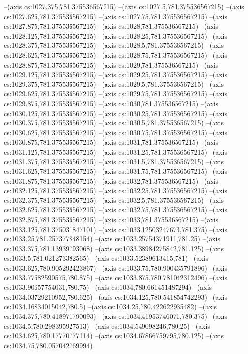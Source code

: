 --(axis cs:1027.375,781.375536567215)
--(axis cs:1027.5,781.375536567215)
--(axis cs:1027.625,781.375536567215)
--(axis cs:1027.75,781.375536567215)
--(axis cs:1027.875,781.375536567215)
--(axis cs:1028,781.375536567215)
--(axis cs:1028.125,781.375536567215)
--(axis cs:1028.25,781.375536567215)
--(axis cs:1028.375,781.375536567215)
--(axis cs:1028.5,781.375536567215)
--(axis cs:1028.625,781.375536567215)
--(axis cs:1028.75,781.375536567215)
--(axis cs:1028.875,781.375536567215)
--(axis cs:1029,781.375536567215)
--(axis cs:1029.125,781.375536567215)
--(axis cs:1029.25,781.375536567215)
--(axis cs:1029.375,781.375536567215)
--(axis cs:1029.5,781.375536567215)
--(axis cs:1029.625,781.375536567215)
--(axis cs:1029.75,781.375536567215)
--(axis cs:1029.875,781.375536567215)
--(axis cs:1030,781.375536567215)
--(axis cs:1030.125,781.375536567215)
--(axis cs:1030.25,781.375536567215)
--(axis cs:1030.375,781.375536567215)
--(axis cs:1030.5,781.375536567215)
--(axis cs:1030.625,781.375536567215)
--(axis cs:1030.75,781.375536567215)
--(axis cs:1030.875,781.375536567215)
--(axis cs:1031,781.375536567215)
--(axis cs:1031.125,781.375536567215)
--(axis cs:1031.25,781.375536567215)
--(axis cs:1031.375,781.375536567215)
--(axis cs:1031.5,781.375536567215)
--(axis cs:1031.625,781.375536567215)
--(axis cs:1031.75,781.375536567215)
--(axis cs:1031.875,781.375536567215)
--(axis cs:1032,781.375536567215)
--(axis cs:1032.125,781.375536567215)
--(axis cs:1032.25,781.375536567215)
--(axis cs:1032.375,781.375536567215)
--(axis cs:1032.5,781.375536567215)
--(axis cs:1032.625,781.375536567215)
--(axis cs:1032.75,781.375536567215)
--(axis cs:1032.875,781.375536567215)
--(axis cs:1033,781.375536567215)
--(axis cs:1033.125,781.375031847101)
--(axis cs:1033.12503247673,781.375)
--(axis cs:1033.25,781.257377848154)
--(axis cs:1033.25754371911,781.25)
--(axis cs:1033.375,781.13939793068)
--(axis cs:1033.38984275842,781.125)
--(axis cs:1033.5,781.021273382565)
--(axis cs:1033.52389613415,781)
--(axis cs:1033.625,780.905292423867)
--(axis cs:1033.75,780.900435791896)
--(axis cs:1033.77582590575,780.875)
--(axis cs:1033.875,780.781042312496)
--(axis cs:1033.90657754031,780.75)
--(axis cs:1034,780.661451487294)
--(axis cs:1034.03729210952,780.625)
--(axis cs:1034.125,780.541854742293)
--(axis cs:1034.16834015042,780.5)
--(axis cs:1034.25,780.422622935482)
--(axis cs:1034.375,780.418971790093)
--(axis cs:1034.41953746071,780.375)
--(axis cs:1034.5,780.298395927513)
--(axis cs:1034.549098246,780.25)
--(axis cs:1034.625,780.17770777114)
--(axis cs:1034.67866759795,780.125)
--(axis cs:1034.75,780.057042769994)
